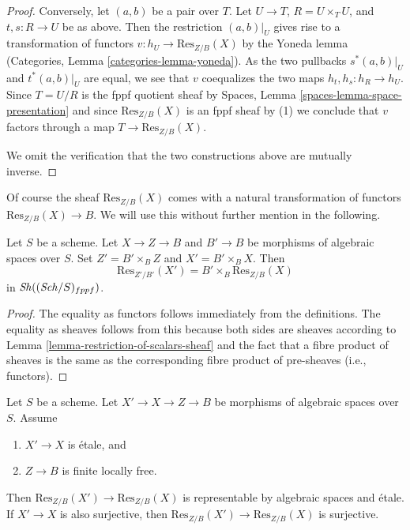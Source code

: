 \begin{proof}
\medskip\noindent
Conversely, let $(a, b)$ be a pair over $T$.
Let $U \to T$, $R = U \times_T U$, and $t, s : R \to U$ be as
above. Then the restriction $(a, b)|_U$ gives rise to a
transformation of functors $v : h_U \to \text{Res}_{Z/B}(X)$ by the
Yoneda lemma
(Categories, Lemma \ref{categories-lemma-yoneda}).
As the two pullbacks $s^*(a, b)|_U$ and $t^*(a, b)|_U$
are equal, we see that $v$ coequalizes the two maps
$h_t, h_s : h_R \to h_U$. Since $T = U/R$ is the fppf quotient sheaf by
Spaces, Lemma \ref{spaces-lemma-space-presentation}
and since $\text{Res}_{Z/B}(X)$ is an fppf sheaf by (1) we conclude
that $v$ factors through a map $T \to \text{Res}_{Z/B}(X)$.

\medskip\noindent
We omit the verification that the two constructions above are mutually
inverse.
\end{proof}

\noindent
Of course the sheaf $\text{Res}_{Z/B}(X)$ comes with a natural transformation
of functors $\text{Res}_{Z/B}(X) \to B$. We will use this without further
mention in the following.

\begin{lemma}
\label{lemma-etale-base-change-restriction-of-scalars}
Let $S$ be a scheme. Let $X \to Z \to B$ and $B' \to B$
be morphisms of algebraic spaces over $S$.
Set $Z' = B' \times_B Z$ and $X' = B' \times_B X$. Then
$$
\text{Res}_{Z'/B'}(X')
=
B' \times_B \text{Res}_{Z/B}(X)
$$
in $\mathop{\mathit{Sh}}\nolimits((\mathit{Sch}/S)_{fppf})$.
\end{lemma}

\begin{proof}
The equality as functors follows immediately from the definitions.
The equality as sheaves follows from this because both sides are
sheaves according to
Lemma \ref{lemma-restriction-of-scalars-sheaf}
and the fact that a fibre product of sheaves is the same as the
corresponding fibre product of pre-sheaves (i.e., functors).
\end{proof}

\begin{lemma}
\label{lemma-etale-covering-restriction-of-scalars}
Let $S$ be a scheme. Let $X' \to X \to Z \to B$ be morphisms of
algebraic spaces over $S$. Assume
\begin{enumerate}
\item $X' \to X$ is \'etale, and
\item $Z \to B$ is finite locally free.
\end{enumerate}
Then $\text{Res}_{Z/B}(X') \to \text{Res}_{Z/B}(X)$ is representable
by algebraic spaces and \'etale. If $X' \to X$ is also surjective,
then $\text{Res}_{Z/B}(X') \to \text{Res}_{Z/B}(X)$ is surjective.
\end{lemma}

